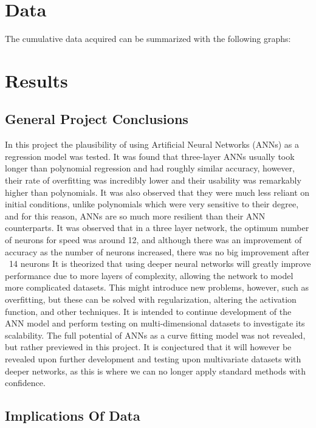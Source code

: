 \documentclass{article}
\begin{document}
    \section{Data}
    The cumulative data acquired can be summarized with the following graphs:

    \section{Results}
    \subsection{General Project Conclusions}

    In this project the plausibility of using Artificial Neural Networks (ANNs) as a regression model was tested. It was found that three-layer ANNs usually took longer than polynomial regression and had roughly similar accuracy, however, their rate of overfitting was incredibly lower and their usability was remarkably higher than polynomials. It was also observed that they were much less reliant on initial conditions, unlike polynomials which were very sensitive to their degree, and for this reason, ANNs are so much more resilient than their ANN counterparts.
    It was observed that in a three layer network, the optimum number of neurons for speed was around 12, and although there was an improvement of accuracy as the number of neurons increased, there was no big improvement after ~14 neurons
    It is theorized that using deeper neural networks will greatly improve performance due to more layers of complexity, allowing the network to model more complicated datasets. This might introduce new problems, however, such as overfitting, but these can be solved with regularization, altering the activation function, and other techniques.
    It is intended to continue development of the ANN model and perform testing on multi-dimensional datasets to investigate its scalability. The full potential of ANNs as a curve fitting model was not revealed, but rather previewed in this project. It is conjectured that it will however be revealed upon further development and testing upon multivariate datasets with deeper networks, as this is where we can no longer apply standard methods with confidence.


    \subsection{Implications Of Data}
\end{document}

